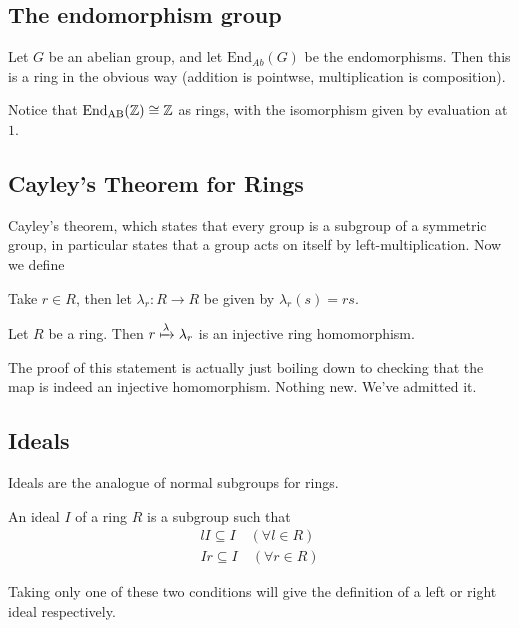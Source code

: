 \documentclass[12pt, twosided]{article}
\begin{document}
\subsection{The endomorphism group}

Let \(G\) be an abelian group, and let \(\mathrm{End}_{Ab}(G)\) be the endomorphisms. Then this is a ring in the obvious way (addition is pointwse, multiplication is composition).

\begin{exa}
  Notice that \(\mathrm{End}_{\mathrm{AB}}(\mathbb{Z}) \cong \mathbb{Z}\) as rings, with the isomorphism given by evaluation at \(1\). 
\end{exa}

\subsection{Cayley's Theorem for Rings}

Cayley's theorem, which states that every group is a subgroup of a symmetric group, in particular states that a group acts on itself by left-multiplication. Now we define

\begin{df}
  Take \(r \in R\), then let \(\lambda_r:R \to R\) be given by \(\lambda_r(s) = rs\).
\end{df}

\begin{thm}
  Let \(R\) be a ring. Then \(r \xmapsto{\lambda} \lambda_r\) is an injective ring homomorphism.
\end{thm}

The proof of this statement is actually just boiling down to checking that the map is indeed an injective homomorphism. Nothing new. We've admitted it.

\subsection{Ideals}
Ideals are the analogue of normal subgroups for rings.

\begin{df}
  An ideal \(I\) of a ring \(R\)  is a subgroup such that
  \begin{align*}
    lI \subseteq I \quad (\forall l \in R) \\
    Ir \subseteq I \quad (\forall r \in R)
  \end{align*}

  Taking only one of these two conditions will give the definition of a left or right ideal respectively.
\end{df}
\end{document}
